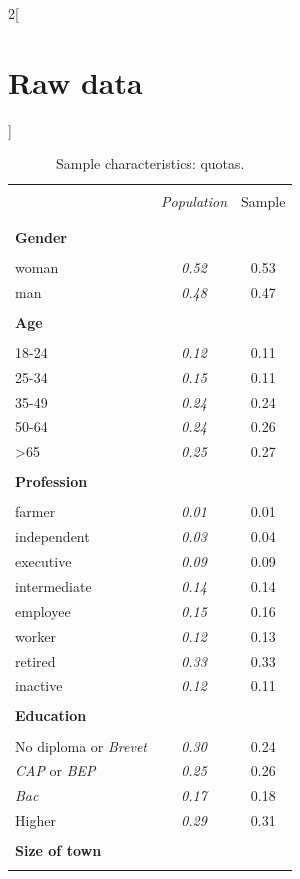 \documentclass[12pt]{article} %
\renewcommand{\arraystretch}{0.73}
\begin{document}
\newpage
{}
\begin{appendices}

\begin{multicols}{2}[\section{Raw data\label{sec:Raw-Data}}]

\renewcommand{\arraystretch}{0.58}

\begin{table}[H]
\label{table:sample_characteristics}
\caption{\label{tab:Sample-Characteristics}Sample characteristics: quotas.}
\centering
\begin{tabular}{lcc}
\hline \hline  \\[-1.8ex]
 & \emph{Population} & Sample  \tabularnewline \\[-1.8ex]
\hline  \\[-1.8ex]
\textbf{Gender} & & \tabularnewline  \\[-1.8ex]
woman & \emph{0.52} & 0.53\tabularnewline
man & \emph{0.48} & 0.47\tabularnewline
\hline \\[-1.8ex]
\textbf{Age} &  & \tabularnewline  \\[-1.8ex]
18-24 & \emph{0.12} & 0.11\tabularnewline
25-34 & \emph{0.15} & 0.11\tabularnewline
35-49 & \emph{0.24} & 0.24\tabularnewline
50-64 & \emph{0.24} & 0.26\tabularnewline
>65 & \emph{0.25} & 0.27\tabularnewline
\hline \\[-1.8ex]
\textbf{Profession} &  & \tabularnewline  \\[-1.8ex]
farmer & \emph{0.01} & 0.01\tabularnewline
independent & \emph{0.03} & 0.04\tabularnewline
executive & \emph{0.09} & 0.09\tabularnewline
intermediate & \emph{0.14} & 0.14\tabularnewline
employee & \emph{0.15} & 0.16\tabularnewline
worker & \emph{0.12} & 0.13\tabularnewline
retired & \emph{0.33} & 0.33\tabularnewline
inactive & \emph{0.12} & 0.11\tabularnewline
\hline  \\[-1.8ex]
\textbf{Education} &  & \tabularnewline  \\[-1.8ex]
No diploma or \emph{Brevet} & \emph{0.30} & 0.24\tabularnewline
\emph{CAP} or \emph{BEP} & \emph{0.25} & 0.26\tabularnewline
\emph{Bac} & \emph{0.17} & 0.18\tabularnewline
Higher & \emph{0.29} & 0.31\tabularnewline
\hline  \\[-1.8ex]
\textbf{Size of town} &  & \tabularnewline  \\[-1.8ex]

\end{tabular}
\end{table}
\end{multicols}
\end{appendices}
\end{document}
